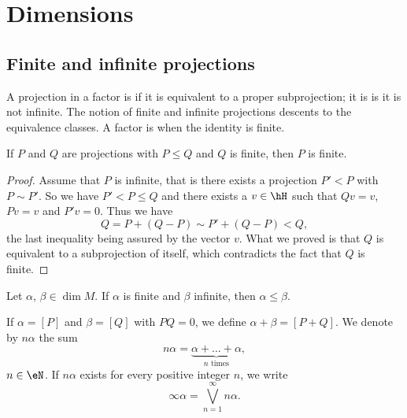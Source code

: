					\section{Dimensions}

					\subsection{Finite and infinite projections}

A projection in a factor is  if it is equivalent to a proper subprojection; it is  is it is not infinite. The notion of finite and infinite projections descents to the equivalence classes. A factor is  when the identity is finite.

\begin{proposition}
If $P$ and $Q$ are projections with $P\leq Q$ and $Q$ is finite, then $P$ is finite.
\end{proposition}

\begin{proof}
Assume that $P$ is infinite, that is there exists a projection $P'<P$ with $P\sim P'$. So we have $P'<P\leq Q$ and there exists a $v\in\hH$ such that $Qv=v$, $Pv=v$ and $P'v=0$. Thus we have
\[ 
	Q=P+(Q-P)\sim P'+(Q-P)<Q,
\]
the last inequality being assured by the vector $v$. What we proved is that $Q$ is equivalent to a subprojection of itself, which contradicts the fact that $Q$ is finite.
\end{proof}

\begin{corollary}
Let $\alpha$, $\beta\in\dim M$. If $\alpha$ is finite and $\beta$ infinite, then $\alpha\leq\beta$.
\end{corollary}

If $\alpha=[P]$ and $\beta=[Q]$ with $PQ=0$, we define $\alpha+\beta=[P+Q]$. We denote by $n\alpha$ the sum
\begin{equation}
	n\alpha=\underbrace{\alpha+\ldots+\alpha}_{\text{$n$ times}},
\end{equation}
$n\in\eN$. If $n\alpha$ exists for every positive integer $n$, we write
\[ 
  \infty\alpha=\bigvee_{n=1}^{\infty}n\alpha.
\]

